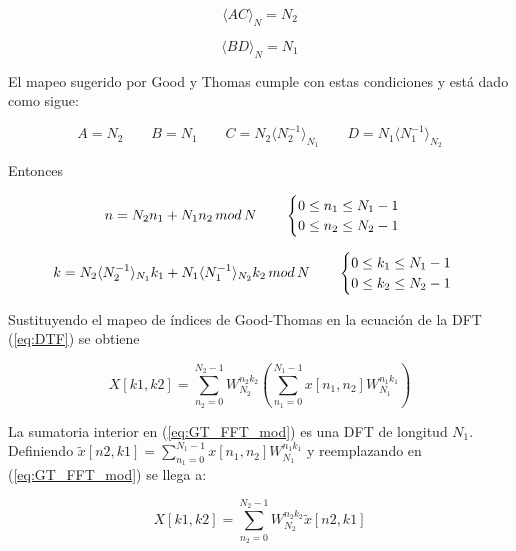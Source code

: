 \begin{equation}
\langle AC \rangle_N = N_2 
\label{eq:GT_cond2}
\end{equation}

\begin{equation}
\langle BD \rangle_N = N_1 
\label{eq:GT_cond3}
\end{equation}

El mapeo sugerido por Good y Thomas cumple con estas condiciones y está dado como sigue:

\begin{equation}
A=N_2 \qquad B=N_1 \qquad C=N_2 \langle N_2^{-1} \rangle_{N_1} \qquad D=N_1 \langle N_1^{-1}
\rangle_{N_2}
\label{eq:GT_mapping}
\end{equation}

Entonces

\begin{equation}
n = N_2n_1 + N_1n_2 \thinspace mod \thinspace N \qquad 
	\begin{cases}
	0\leq n_1 \leq N_1 -1 \\
	0\leq n_2 \leq N_2 -1
	\end{cases}
\label{eq:GT_time_inedx}
\end{equation}

\begin{equation}
k = N_2 \langle N_2^{-1} \rangle_{N_1}k_1 + N_1 \langle N_1^{-1}
\rangle_{N_2}k_2 \thinspace mod \thinspace N \qquad 
	\begin{cases}
	0\leq k_1 \leq N_1 -1 \\
	0\leq k_2 \leq N_2 -1
	\end{cases}
\label{eq:GT_time_inedx}
\end{equation}

Sustituyendo el mapeo de índices de Good-Thomas en la ecuación de la DFT (\ref{eq:DTF}) se obtiene

\begin{equation}
X[k1,k2]=\sum_{n_2=0}^{N_2-1}
W_{N_2}^{n_2k_2}\left(\sum_{n_1=0}^{N_1-1}x[n_1,n_2]W_{N_1}^{n_1k_1}\right)
\label{eq:GT_FFT_mod}
\end{equation}

La sumatoria interior en (\ref{eq:GT_FFT_mod}) es una DFT de longitud $N_1$. Definiendo
$\tilde{x}[n2,k1]=\sum_{n_1=0}^{N_1-1}x[n_1,n_2]W_{N_1}^{n_1k_1}$
y reemplazando en (\ref{eq:GT_FFT_mod}) se llega a:

\begin{equation}
X[k1,k2]=\sum_{n_2=0}^{N_2-1}
W_{N_2}^{n_2k_2}\tilde{x}[n2,k1]
\label{eq:GT_DFT_tilde}
\end{equation}

